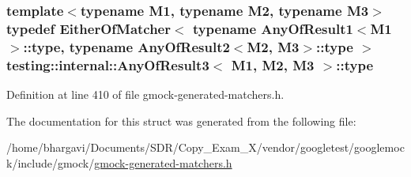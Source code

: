 \subsubsection[{\texorpdfstring{type}{type}}]{\setlength{\rightskip}{0pt plus 5cm}template$<$typename M1, typename M2, typename M3$>$ typedef {\bf Either\+Of\+Matcher}$<$ typename {\bf Any\+Of\+Result1}$<$M1$>$\+::{\bf type}, typename {\bf Any\+Of\+Result2}$<$M2, M3$>$\+::{\bf type} $>$ {\bf testing\+::internal\+::\+Any\+Of\+Result3}$<$ M1, M2, M3 $>$\+::{\bf type}}\hypertarget{structtesting_1_1internal_1_1_any_of_result3_a232b20553cc0a33a6741e85e19ef4b0c}{}\label{structtesting_1_1internal_1_1_any_of_result3_a232b20553cc0a33a6741e85e19ef4b0c}


Definition at line 410 of file gmock-\/generated-\/matchers.\+h.



The documentation for this struct was generated from the following file\+:\begin{DoxyCompactItemize}
\item 
/home/bhargavi/\+Documents/\+S\+D\+R/\+Copy\+\_\+\+Exam\+\_\+X/vendor/googletest/googlemock/include/gmock/\hyperlink{gmock-generated-matchers_8h}{gmock-\/generated-\/matchers.\+h}\end{DoxyCompactItemize}
